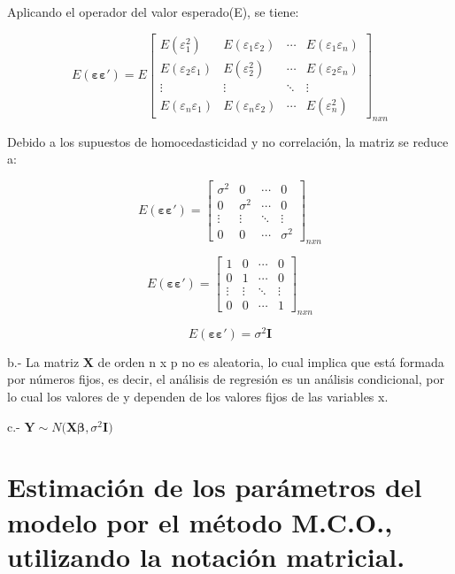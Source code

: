 \documentclass[
]{book}
\begin{document}
Aplicando el operador del valor esperado(E), se tiene:

\[
E(\boldsymbol{\varepsilon\varepsilon'})=E\begin{bmatrix}
 E(\varepsilon_{1}^2)&  E(\varepsilon_{1}\varepsilon_{2})&  \cdots & E(\varepsilon_{1}\varepsilon_{n})\\ 
 E(\varepsilon_{2}\varepsilon_{1})&  E(\varepsilon_{2}^2)&  \cdots& E(\varepsilon_{2}\varepsilon_{n})\\ 
 \vdots &  \vdots &  \ddots & \vdots\\ 
 E(\varepsilon_{n}\varepsilon_{1})&  E(\varepsilon_{n}\varepsilon_{2})&  \cdots& E(\varepsilon_{n}^2)
\end{bmatrix}_{nxn}
\]

Debido a los supuestos de homocedasticidad y no correlación, la matriz se reduce a:

\[
E(\boldsymbol{\varepsilon\varepsilon'})=\begin{bmatrix}
 \sigma^2&  0&  \cdots & 0\\ 
 0&  \sigma^2&  \cdots& 0\\ 
 \vdots &  \vdots &  \ddots & \vdots\\ 
 0&  0&  \cdots& \sigma^2 
\end{bmatrix}_{nxn}
\]

\[
E(\boldsymbol{\varepsilon\varepsilon'})=\begin{bmatrix}
 1&  0&  \cdots & 0\\ 
 0&  1&  \cdots& 0\\ 
 \vdots &  \vdots &  \ddots & \vdots\\ 
 0&  0&  \cdots& 1 
\end{bmatrix}_{nxn}
\]

\[
\begin{equation}
E(\boldsymbol{\varepsilon\varepsilon'})=\sigma^2\boldsymbol{I}
\label{eq:covarianza-errores-regresion-lineal}
\end{equation}
\]

b.- La matriz \(\mathbf{X}\) de orden n x p no es aleatoria, lo cual implica que está formada por números fijos, es decir, el análisis de regresión es un análisis condicional, por lo cual los valores de y dependen de los valores fijos de las variables x.

c.- \(\mathbf{Y} \sim N(\mathbf{X \boldsymbol{\beta}}, \sigma^2\mathbf{I)}\)

\hypertarget{estimaciuxf3n-de-los-paruxe1metros-del-modelo-por-el-muxe9todo-m.c.o.-utilizando-la-notaciuxf3n-matricial.}{%
\section{Estimación de los parámetros del modelo por el método M.C.O., utilizando la notación matricial.}\label{estimaciuxf3n-de-los-paruxe1metros-del-modelo-por-el-muxe9todo-m.c.o.-utilizando-la-notaciuxf3n-matricial.}}
\end{document}
